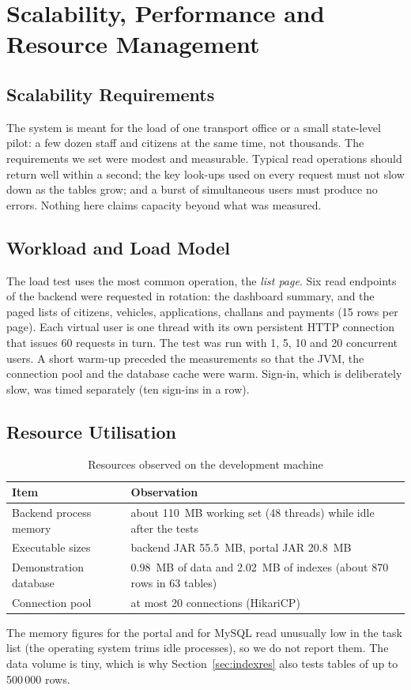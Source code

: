 \chapter{Scalability, Performance and Resource Management}\label{ch:perf}

\section{Scalability Requirements}
The system is meant for the load of one transport office or a small state-level pilot:
a few dozen staff and citizens at the same time, not thousands. The requirements we set
were modest and measurable. Typical read operations should return well within a second;
the key look-ups used on every request must not slow down as the tables grow; and a burst
of simultaneous users must produce no errors. Nothing here claims capacity beyond what was
measured.

\section{Workload and Load Model}
The load test uses the most common operation, the \emph{list page}. Six read endpoints
of the backend were requested in rotation: the dashboard summary, and the paged lists of
citizens, vehicles, applications, challans and payments (15 rows per page). Each virtual
user is one thread with its own persistent HTTP connection that issues 60 requests in
turn. The test was run with 1, 5, 10 and 20 concurrent users. A short warm-up preceded the
measurements so that the JVM, the connection pool and the database cache were warm.
Sign-in, which is deliberately slow, was timed separately (ten sign-ins in a row).

\section{Resource Utilisation}
\begin{table}[H]
\centering\small
\caption{Resources observed on the development machine}\label{tab:res}
\begin{tabularx}{\linewidth}{@{}p{5.2cm}X@{}}
\toprule \textbf{Item} & \textbf{Observation}\\ \midrule
Backend process memory & about 110~MB working set (48 threads) while idle after the tests\\
Executable sizes & backend JAR 55.5~MB, portal JAR 20.8~MB\\
Demonstration database & 0.98~MB of data and 2.02~MB of indexes (about 870 rows in 63 tables)\\
Connection pool & at most 20 connections (HikariCP)\\
\bottomrule
\end{tabularx}
\end{table}
The memory figures for the portal and for MySQL read unusually low in the task list (the
operating system trims idle processes), so we do not report them. The data volume is tiny,
which is why Section~\ref{sec:indexres} also tests tables of up to 500\,000 rows.

